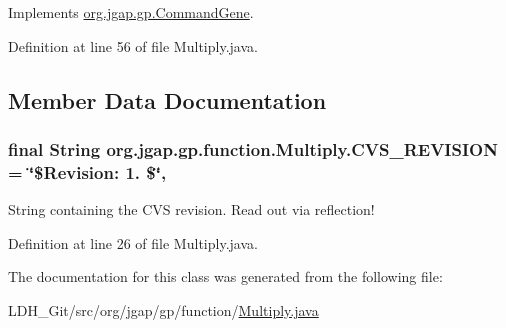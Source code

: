 Implements \hyperlink{classorg_1_1jgap_1_1gp_1_1_command_gene_a236141d99059da808afe7a9217e411c7}{org.\-jgap.\-gp.\-Command\-Gene}.



Definition at line 56 of file Multiply.\-java.



\subsection{Member Data Documentation}
\hypertarget{classorg_1_1jgap_1_1gp_1_1function_1_1_multiply_ab85691969835043a65dbd9ab091ee9bc}{
\subsubsection[{C\-V\-S\-\_\-\-R\-E\-V\-I\-S\-I\-O\-N}]{\setlength{\rightskip}{0pt plus 5cm}final String org.\-jgap.\-gp.\-function.\-Multiply.\-C\-V\-S\-\_\-\-R\-E\-V\-I\-S\-I\-O\-N = \char`\"{}\$Revision\-: 1. \$\char`\"{}\hspace{0.3cm}{\ttfamily [static]}, {\ttfamily [private]}}}\label{classorg_1_1jgap_1_1gp_1_1function_1_1_multiply_ab85691969835043a65dbd9ab091ee9bc}
String containing the C\-V\-S revision. Read out via reflection! 

Definition at line 26 of file Multiply.\-java.



The documentation for this class was generated from the following file\-:\begin{DoxyCompactItemize}
\item 
L\-D\-H\-\_\-\-Git/src/org/jgap/gp/function/\hyperlink{_multiply_8java}{Multiply.\-java}\end{DoxyCompactItemize}
